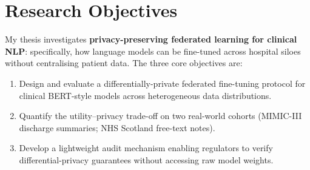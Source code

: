 \section{Research Objectives}

My thesis investigates \textbf{privacy-preserving federated learning for clinical NLP}:
specifically, how language models can be fine-tuned across hospital siloes without
centralising patient data. The three core objectives are:

\begin{enumerate}[leftmargin=*, itemsep=1pt, topsep=2pt]
  \item Design and evaluate a differentially-private federated fine-tuning protocol for
        clinical BERT-style models across heterogeneous data distributions.
  \item Quantify the utility–privacy trade-off on two real-world cohorts (MIMIC-III
        discharge summaries; NHS Scotland free-text notes).
  \item Develop a lightweight audit mechanism enabling regulators to verify differential-privacy
        guarantees without accessing raw model weights.
\end{enumerate}

